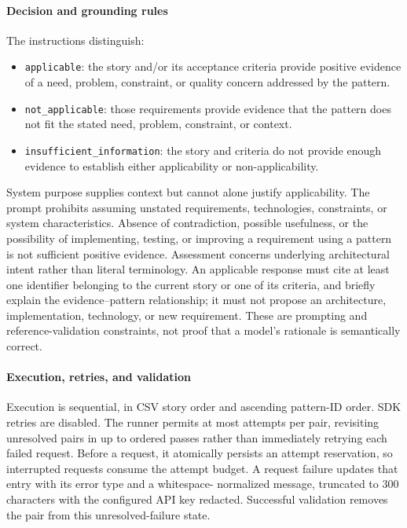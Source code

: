 \paragraph{Decision and grounding rules}
The instructions distinguish:
\begin{itemize}
  \item \texttt{applicable}: the story and/or its acceptance criteria provide
  positive evidence of a need, problem, constraint, or quality concern addressed
  by the pattern.
  \item \texttt{not\_applicable}: those requirements provide evidence that the
  pattern does not fit the stated need, problem, constraint, or context.
  \item \texttt{insufficient\_information}: the story and criteria do not provide
  enough evidence to establish either applicability or non-applicability.
\end{itemize}
System purpose supplies context but cannot alone justify applicability.
The prompt prohibits assuming unstated requirements, technologies, constraints,
or system characteristics. Absence of contradiction, possible usefulness, or
the possibility of implementing, testing, or improving a requirement using a
pattern is not sufficient positive evidence. Assessment concerns underlying
architectural intent rather than literal terminology. An applicable response
must cite at least one identifier belonging to the current story or one of its
criteria, and briefly explain the evidence--pattern relationship; it must not
propose an architecture, implementation, technology, or new requirement.
These are prompting and reference-validation constraints, not proof that a
model's rationale is semantically correct.

\paragraph{Execution, retries, and validation}
Execution is sequential, in CSV story order and ascending pattern-ID order.
SDK retries are disabled. The runner permits at most
\ApplicabilityMaxAttempts{} attempts per pair, revisiting unresolved pairs
in up to \ApplicabilityMaxAttempts{} ordered passes rather than immediately
retrying each failed request. Before a request, it atomically persists an
attempt reservation, so interrupted requests consume the attempt budget.
A request failure updates that entry with its error type and a whitespace-
normalized message, truncated to 300 characters with the configured API key
redacted. Successful validation removes the pair from this unresolved-failure
state.

